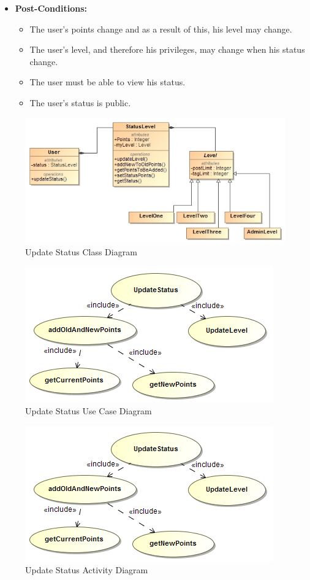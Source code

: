 \documentclass[11pt]{article}
\begin{document}
\begin{enumerate}
\begin{itemize}
\item\textbf{Post-Conditions: }
	\begin{itemize}
		\item The user's points change and as a result of this, his level may change.
		\item The user's level, and therefore his privileges, may change when his status change.
		\item The user must be able to view his status.
		\item The user's status is public.
	\end{itemize}
\end{itemize}
\graphicspath{ {../Diagrams/Maret/class/} }
	\begin{figure}[H]	
    	\includegraphics[scale=0.5]{UpdateStatus.jpg}
    	\caption{Update Status Class Diagram}
	\end{figure}
\graphicspath{ {../Diagrams/Maret/usecase/} }	
	\begin{figure}[H]	
    	\includegraphics[scale=0.5]{UpdateStatus.png}
    	\caption{Update Status Use Case Diagram}
	\end{figure}
	
\graphicspath{ {../Diagrams/Maret/activity/} }
	\begin{figure}[H]	
    	\includegraphics[scale=0.5]{UpdateStatus.png}
    	\caption{Update Status Activity Diagram}
	\end{figure}
	



\end{enumerate}
\end{document}
